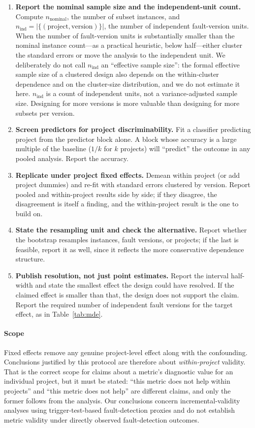 \documentclass[preprint,12pt]{elsarticle}
\begin{document}
\begin{enumerate}
\item \textbf{Report the nominal sample size and the independent-unit
count.} Compute $n_{\text{nominal}}$, the number of subset instances, and
$n_{\text{ind}} = |\{(\text{project}, \text{version})\}|$, the number of
independent fault-version units. When the number of fault-version units is
substantially smaller than the nominal instance count---as a practical
heuristic, below half---either cluster the standard errors or move the
analysis to the independent unit.
We deliberately do not call $n_{\text{ind}}$ an ``effective sample size'':
the formal effective sample size of a clustered design also depends on the
within-cluster dependence and on the cluster-size distribution, and we do
not estimate it here. $n_{\text{ind}}$ is a count of independent units, not
a variance-adjusted sample size. Designing for more versions is more
valuable than designing for more subsets per version.
\item \textbf{Screen predictors for project discriminability.} Fit a
classifier predicting project from the predictor block alone. A block whose
accuracy is a large multiple of the baseline ($1/k$ for $k$ projects) will
``predict'' the outcome in any pooled analysis. Report the accuracy.
\item \textbf{Replicate under project fixed effects.} Demean within project
(or add project dummies) and re-fit with standard errors clustered by
version. Report pooled and within-project results side by side; if they
disagree, the disagreement is itself a finding, and the within-project
result is the one to build on.
\item \textbf{State the resampling unit and check the alternative.} Report
whether the bootstrap resamples instances, fault versions, or projects; if
the last is feasible, report it as well, since it reflects the more conservative dependence structure.
\item \textbf{Publish resolution, not just point estimates.} Report the
interval half-width and state the smallest
effect the design could have resolved. If the claimed effect is smaller
than that, the design does not support the claim. Report the required
number of independent fault versions for the target effect, as in
Table~\ref{tab:mde}.
\end{enumerate}

\paragraph{Scope} Fixed effects remove any genuine project-level effect
along with the confounding. Conclusions justified by this protocol are
therefore about \emph{within-project} validity. That is the correct scope
for claims about a metric's diagnostic value for an individual project, but
it must be stated: ``this metric does not help within projects'' and ``this
metric does not help'' are different claims, and only the former follows
from the analysis. Our conclusions concern incremental-validity analyses
using trigger-test-based fault-detection proxies and do not establish
metric validity under directly observed fault-detection outcomes.
\end{document}
